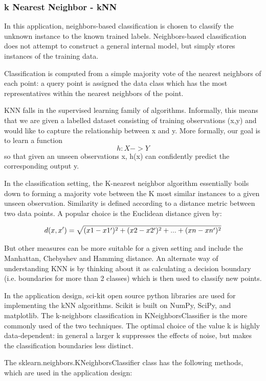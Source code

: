 \documentclass[sigconf]{acmart}
\begin{document}
\subsubsection{k Nearest Neighbor - kNN}
\cite{Kevin2016} In this application, neighbors-based classification is chosen to classify the unknown instance to the known trained labels. Neighbors-based classification does not attempt to construct a general internal model, but simply stores instances of the training data.


Classification is computed from a simple majority vote of the nearest neighbors of each point: a query point is assigned the data class which has the most representatives within the nearest neighbors of the point.


KNN falls in the supervised learning family of algorithms. Informally, this means that we are given a labelled dataset consisting of training observations (x,y) and would like to capture the relationship between x and y. More formally, our goal is to learn a function \[h:X ->Y\] so that given an unseen observations x, h(x) can confidently predict the corresponding output y.


In the classification setting, the K-nearest neighbor algorithm essentially boils down to forming a majority vote between the K most similar instances to a given unseen observation. Similarity is defined according to a distance metric between two data points. A popular choice is the Euclidean distance given by:


\[
d(x,x')=\sqrt{(x1-x1\rq)^2+(x2-x2\rq)^2+...+(xn-xn\rq)^2}
\]


But other measures can be more suitable for a given setting and include the Manhattan, Chebyshev and Hamming distance. 
An alternate way of understanding KNN is by thinking about it as calculating a decision boundary (i.e. boundaries for more than 2 classes) which is then used to classify new points.

In the application design, sci-kit open source python libraries are used for implementing the kNN algorithms. Scikit is built on NumPy, SciPy, and matplotlib. The k-neighbors classification in KNeighborsClassifier is the more commonly used of the two techniques. The optimal choice of the value k is highly data-dependent: in general a larger k suppresses the effects of noise, but makes the classification boundaries less distinct.

The sklearn.neighbors.KNeighborsClassifier class has the following methods, which are used in the application design:
\end{document}
